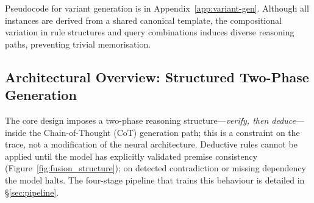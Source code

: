 \documentclass{article}
\begin{document}
Pseudocode for variant generation is in Appendix~\ref{app:variant-gen}. Although all instances are derived from a shared canonical template, the compositional variation in rule structures and query combinations induces diverse reasoning paths, preventing trivial memorisation.

\subsection{Architectural Overview: Structured Two-Phase Generation}
The core design imposes a two-phase reasoning structure---\emph{verify, then deduce}---inside the Chain-of-Thought (CoT) generation path; this is a constraint on the trace, not a modification of the neural architecture. Deductive rules cannot be applied until the model has explicitly validated premise consistency (Figure~\ref{fig:fusion_structure}); on detected contradiction or missing dependency the model halts. The four-stage pipeline that trains this behaviour is detailed in \S\ref{sec:pipeline}.
\end{document}
